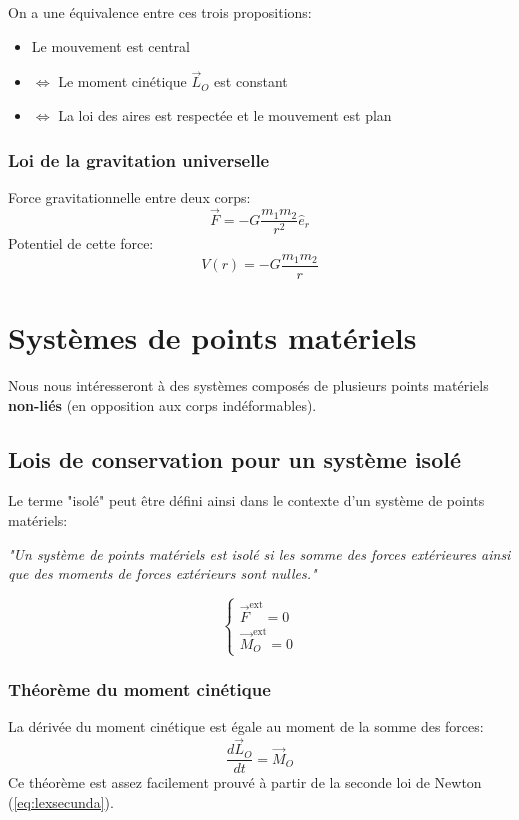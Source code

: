 \documentclass{article}
\numberwithin{equation}{section}
\begin{document}
On a une équivalence entre ces trois propositions:
\begin{itemize}
	\item \quad Le mouvement est central
	\item \(\Leftrightarrow\) Le moment cinétique \(\vec L_O\) est constant
	\item \(\Leftrightarrow\) La loi des aires est respectée et le mouvement est plan
\end{itemize}

\subsubsection{Loi de la gravitation universelle}
Force gravitationnelle entre deux corps:
\begin{equation}
	\boxed{ \vec F = -G \dfrac{m_1m_2}{r^2} \hat e_r }
\end{equation}
Potentiel de cette force:
\begin{equation}
	\boxed{ V(r) = -G \dfrac{m_1m_2}{r} }
\end{equation}

\section{Systèmes de points matériels}
Nous nous intéresseront à des systèmes composés de plusieurs points matériels \textbf{non-liés} (en opposition aux corps indéformables). %

\subsection{Lois de conservation pour un système isolé}
Le terme "isolé" peut être défini ainsi dans le contexte d'un système de points matériels:
\begin{center}
	\emph{"Un système de points matériels est isolé si les somme des forces extérieures ainsi que des moments de forces extérieurs sont nulles."}
\end{center}
\begin{equation*}
	\boxed{ \begin{cases} 
		\vec F^{\text{ext}} = 0 \\
		\vec M_O^{\text{ext}} = 0
	\end{cases} }
\end{equation*}

\subsubsection{Théorème du moment cinétique}
La dérivée du moment cinétique est égale au moment de la somme des forces:
\begin{equation} \label{eq:thmmomentcinetique}
	\boxed{ \frac{d \vec L_O }{dt} = \vec M_O }
\end{equation}
Ce théorème est assez facilement prouvé à partir de la seconde loi de Newton (\ref{eq:lexsecunda}).
\end{document}
